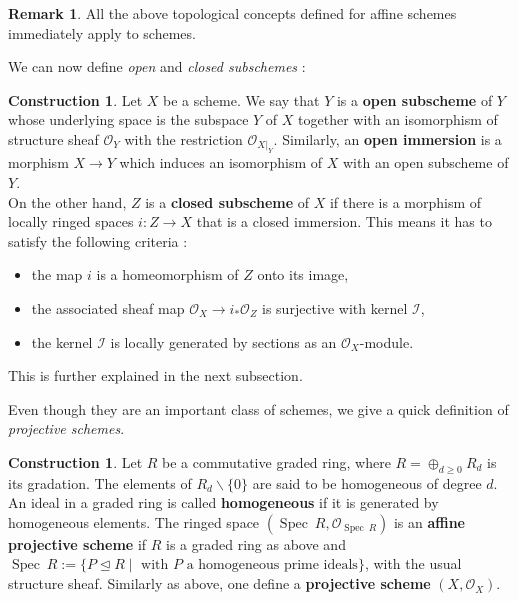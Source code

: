 \documentclass{article}
\theoremstyle{plain}
\theoremstyle{definition}
\newtheorem{remark}{Remark}
\newtheorem{construction}[theorem]{Construction}
\DeclareMathOperator{\Spec}{Spec}
\begin{document}
\begin{remark}
    All the above topological concepts defined for affine schemes immediately apply to schemes.
\end{remark}





\noindent We can now define \textit{open} and \textit{closed subschemes} :
\begin{construction}
    Let $X$ be a scheme.
    We say that $Y$ is a \textbf{open subscheme} of $Y$ whose underlying space is the subspace $Y$ of $X$ together with an isomorphism of structure sheaf $\mathcal{O}_Y$ with the restriction $\mathcal{O}_{X\vert_Y}$. Similarly, an \textbf{open immersion} is a morphism $X\rightarrow Y$ which induces an isomorphism of $X$ with an open subscheme of $Y$.\\
    On the other hand, $Z$ is a \textbf{closed subscheme} of $X$ if there is a morphism of locally ringed spaces $i:Z\rightarrow X$ that is a closed immersion.
    This means it has to satisfy the following criteria :
    \begin{itemize}
        \item[$\cdot$] the map $i$ is a homeomorphism of $Z$ onto its image,
        \item[$\cdot$] the associated sheaf map $\mathcal{O}_X\rightarrow i_*\mathcal{O}_Z$ is surjective with kernel $\mathcal{I}$,
        \item[$\cdot$] the kernel $\mathcal{I}$ is locally generated by sections as an $\mathcal{O}_X$-module.
    \end{itemize}
    This is further explained in the next subsection.
\end{construction}

\noindent Even though they are an important class of schemes, we give a quick definition of \textit{projective schemes}.
\begin{construction}
    Let $R$ be a commutative graded ring, where $R = \oplus_{d\ge 0} R_d$ is its gradation. 
    The elements of $R_d\backslash \{0\}$ are said to be homogeneous of degree $d$.
    An ideal in a graded ring is called \textbf{homogeneous} if it is generated by homogeneous elements.
    The ringed space $(\Spec\: R, \mathcal{O}_{\Spec\:R})$ is an \textbf{affine projective scheme} if $R$ is a graded ring as above and $\Spec\:R := \{P \trianglelefteq R \mid \text{ with } P \text{ a homogeneous prime ideals} \}$, with the usual structure sheaf.
    Similarly as above, one define a \textbf{projective scheme} $(X,\mathcal{O}_X)$.
\end{construction}
\end{document}
